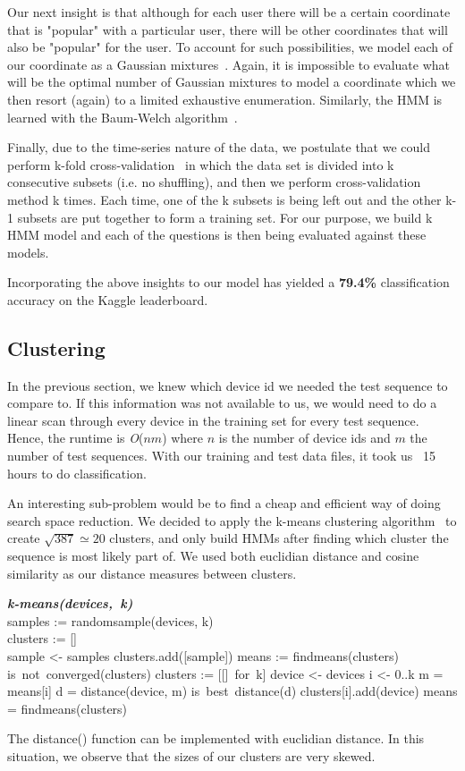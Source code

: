 Our next insight is that although for each user there will be a certain
coordinate that is "popular" with a particular user, there will be other coordinates
that will also be "popular" for the user. To account for such possibilities, we
model each of our coordinate as a Gaussian mixtures~\cite{GMM2009}. Again, it
is impossible to evaluate what will be the optimal number of Gaussian mixtures
to model a coordinate which we then resort (again) to a limited exhaustive
enumeration. Similarly, the HMM is learned with the Baum-Welch algorithm~\cite{BaumWelch}.

Finally, due to the time-series nature of the data, we postulate that we could
perform k-fold cross-validation~\cite{KFold2013} in which the data set is
divided into k consecutive subsets (i.e. no shuffling), and then we perform
cross-validation method k times. Each time, one of the k subsets is being left
out and the other k-1 subsets are put together to form a training set. For our
purpose, we build k HMM model and each of the questions is then being evaluated
against these models.

Incorporating the above insights to our model has yielded a \textbf{79.4\%}
classification accuracy on the Kaggle leaderboard.

\subsection{Clustering}
In the previous section, we knew which device id we needed the test sequence
to compare to. If this information was not available to us, we would need
to do a linear scan through every device in the training set for every
test sequence. Hence, the runtime is \textit{O}($nm$) where $n$ is the
number of device ids and $m$ the number of test sequences. With our
training and test data files, it took us ~15 hours to do classification.

An interesting sub-problem would be to find a cheap and efficient way of
doing search space reduction. We decided to apply the k-means clustering
algorithm~\cite{kmeans} to create $\sqrt{387} \simeq 20$ clusters, and only build HMMs
after finding which cluster the sequence is most likely part of. We used both
euclidian distance and cosine similarity as our distance measures between
clusters.

\begin{program}
\mbox{\textit{\textbf{k-means(devices, k)}}}
\BEGIN \\
  samples := randomsample(devices, k) \\
  clusters := [] \\
  \FOR sample <- samples \DO
    clusters.add([sample]) \OD
  means := findmeans(clusters)
  \WHILE is\ not\ converged(clusters) \DO
    clusters := [[]\ for\ k]
    \FOR device <- devices \DO
      \FOR i <- 0..k \DO
        m = means[i]
        d = distance(device, m)
        \IF is\ best\ distance(d)
          clusters[i].add(device)
        \OD
        \OD
    means = findmeans(clusters)
    \OD
\END
\end{program}
The distance() function can be implemented with euclidian distance. In this
situation, we observe that the sizes of our clusters are very skewed.

